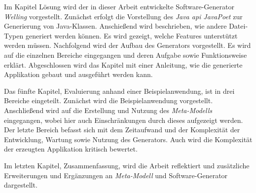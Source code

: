 Im Kapitel Lösung wird der in dieser Arbeit entwickelte Software-Generator \textit{Welling} vorgestellt.
Zunächst erfolgt die Vorstellung des \textit{Java \acf{api} JavaPoet} zur Generierung von Java-Klassen. Anschießend wird beschrieben, wie andere Datei-Typen generiert werden können. Es wird gezeigt, welche Features unterstützt werden müssen. Nachfolgend wird der Aufbau des Generators vorgestellt. Es wird auf die einzelnen Bereiche eingegangen und deren Aufgabe sowie Funktionsweise erklärt. Abgeschlossen wird das Kapitel mit einer Anleitung, wie die generierte Applikation gebaut und ausgeführt werden kann.

Das fünfte Kapitel, Evaluierung anhand einer Beispielanwendung, ist in drei Bereiche eingeteilt. Zunächst wird die Beispielanwendung vorgestellt. Anschließend wird auf die Erstellung und Nutzung des \textit{Meta-Modells} eingegangen, wobei hier auch Einschränkungen durch dieses aufgezeigt werden. Der letzte Bereich befasst sich mit dem Zeitaufwand und der Komplexität der Entwicklung, Wartung sowie Nutzung des Generators. Auch wird die Komplexität der erzeugten Applikation kritisch bewertet.

Im letzten Kapitel, Zusammenfassung, wird die Arbeit reflektiert und zusätzliche Erweiterungen und Ergänzungen an \textit{Meta-Modell} und Software-Generator dargestellt.